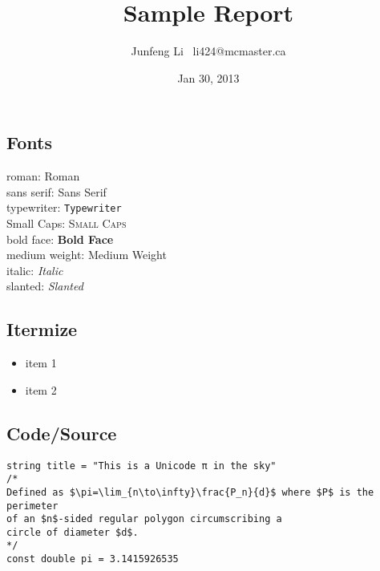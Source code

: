 \documentclass{article}
\title{Sample Report}
\author{Junfeng Li \ li424@mcmaster.ca}
\date{Jan 30, 2013}
\begin{document}
\maketitle

\subsection{Fonts}

roman: \textrm{Roman} \\
sans serif: \textsf{Sans Serif} \\
typewriter: \texttt{Typewriter} \\
Small Caps: \textsc{Small Caps} \\
bold face: \textbf{Bold Face} \\
medium weight: \textmd{Medium Weight} \\
italic: \textit{Italic} \\
slanted: \textsl{Slanted} \\

\subsection{Itermize}

\begin{itemize}
\item item 1
\item item 2
\end{itemize}

\subsection{Code/Source}

\begin{verbatim}
string title = "This is a Unicode π in the sky"
/*
Defined as $\pi=\lim_{n\to\infty}\frac{P_n}{d}$ where $P$ is the perimeter
of an $n$-sided regular polygon circumscribing a
circle of diameter $d$.
*/
const double pi = 3.1415926535
\end{verbatim}
\end{document}
